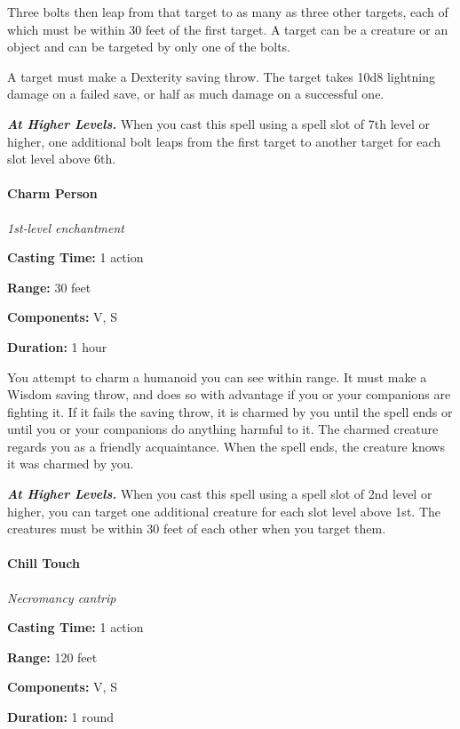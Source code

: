 \documentclass[
]{article}
\begin{document}
Three bolts then leap from that target to as many as three other
targets, each of which must be within 30 feet of the first target. A
target can be a creature or an object and can be targeted by only one of
the bolts.

A target must make a Dexterity saving throw. The target takes 10d8
lightning damage on a failed save, or half as much damage on a
successful one.

\emph{\textbf{At Higher Levels.}} When you cast this spell using a spell
slot of 7th level or higher, one additional bolt leaps from the first
target to another target for each slot level above 6th.

\hypertarget{charm-person}{%
\paragraph{Charm Person}\label{charm-person}}

\emph{1st-level enchantment}

\textbf{Casting Time:} 1 action

\textbf{Range:} 30 feet

\textbf{Components:} V, S

\textbf{Duration:} 1 hour

You attempt to charm a humanoid you can see within range. It must make a
Wisdom saving throw, and does so with advantage if you or your
companions are fighting it. If it fails the saving throw, it is charmed
by you until the spell ends or until you or your companions do anything
harmful to it. The charmed creature regards you as a friendly
acquaintance. When the spell ends, the creature knows it was charmed by
you.

\emph{\textbf{At Higher Levels.}} When you cast this spell using a spell
slot of 2nd level or higher, you can target one additional creature for
each slot level above 1st. The creatures must be within 30 feet of each
other when you target them.

\hypertarget{chill-touch}{%
\paragraph{Chill Touch}\label{chill-touch}}

\emph{Necromancy cantrip}

\textbf{Casting Time:} 1 action

\textbf{Range:} 120 feet

\textbf{Components:} V, S

\textbf{Duration:} 1 round
\end{document}

